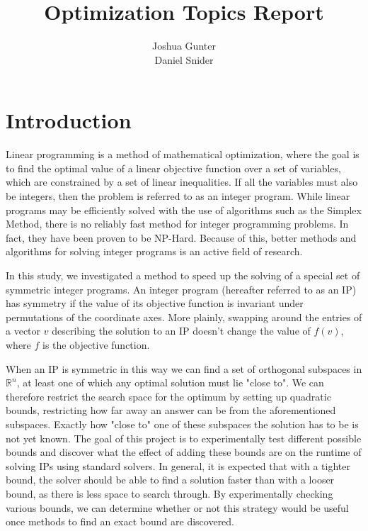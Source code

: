\documentclass[11pt]{article} %
\title{Optimization Topics Report}
\author{Joshua Gunter\\  Daniel Snider}
\theoremstyle{definition}
\theoremstyle{remark}
\begin{document}
\maketitle

\tableofcontents

\section{Introduction}

Linear programming is a method of mathematical optimization, where the goal is to find the optimal value of a linear objective function over a set of variables, which are constrained by a set of linear inequalities. If all the variables must also be integers, then the problem is referred to as an integer program. While linear programs may be efficiently solved with the use of algorithms such as the Simplex Method, there is no reliably fast method for integer programming problems. In fact, they have been proven to be NP-Hard. Because of this, better methods and algorithms for solving integer programs is an active field of research.

In this study, we investigated a method to speed up the solving of a special set of symmetric integer programs. An integer program (hereafter referred to as an IP) has symmetry if the value of its objective function is invariant under permutations of the coordinate axes. More plainly, swapping around the entries of a vector $v$ describing the solution to an IP doesn't change the value of $f(v)$, where $f$ is the objective function.

When an IP is symmetric in this way we can find a set of orthogonal subspaces in $\mathbb{R}^n$, at least one of which any optimal solution must lie "close to". We can therefore restrict the search space for the optimum by setting up quadratic bounds, restricting how far away an answer can be from the aforementioned subspaces. Exactly how "close to" one of these subspaces the solution has to be is not yet known. The goal of this project is to experimentally test different possible bounds and discover what the effect of adding these bounds are on the runtime of solving IPs using standard solvers. In general, it is expected that with a tighter bound, the solver should be able to find a solution faster than with a looser bound, as there is less space to search through. By experimentally checking various bounds, we can determine whether or not this strategy would be useful once methods to find an exact bound are discovered.
\end{document}
